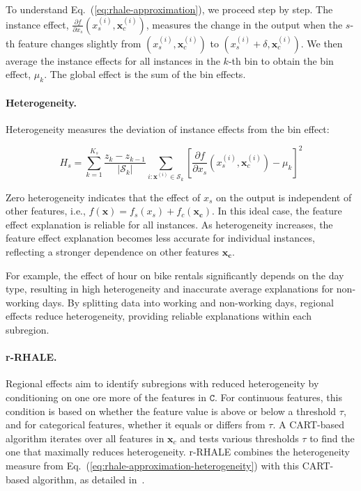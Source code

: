\documentclass[sigconf, nonacm]{acmart}
\newcommand{\xb}{\mathbf{x}}
\newcommand{\xc}{\mathbf{x_c}}
\newcommand{\xci}{\mathbf{x}^{(i)}_c}
\begin{document}
To understand Eq.~(\ref{eq:rhale-approximation}), we proceed step by step. The instance effect, $\frac{\partial f}{\partial x_s} (x_s^{(i)}, \xci)$, measures the change in the output when the $s$-th feature changes slightly from $(x_s^{(i)}, \xci)$ to $(x_s^{(i)} + \delta, \xci)$. We then average the instance effects for all instances in the $k$-th bin to obtain the bin effect, $\mu_k$. The global effect is the sum of the bin effects.

\paragraph{Heterogeneity.}

Heterogeneity measures the deviation of instance effects from the bin effect:

\begin{equation}
  \label{eq:rhale-approximation-heterogeneity}
  H_s = \sum_{k=1}^{K_s} \frac{z_k - z_{k-1}}{|\mathcal{S}_k|}\sum_{i: \xb^{(i)} \in \mathcal{S}_k} \left [ \frac{\partial f}{\partial x_s} (x_s^{(i)}, \xci) - \mu_k \right ]^2
\end{equation}

\noindent
Zero heterogeneity indicates that the effect of $x_s$ on the output is independent of other features, i.e., \( f(\xb) = f_s(x_s) + f_c(\xc) \). In this ideal case, the feature effect explanation is reliable for all instances. As heterogeneity increases, the feature effect explanation becomes less accurate for individual instances, reflecting a stronger dependence on other features $\xc$. 

For example, the effect of hour on bike rentals significantly depends on the day type, resulting in high heterogeneity and inaccurate average explanations for non-working days. By splitting data into working and non-working days, regional effects reduce heterogeneity, providing reliable explanations within each subregion.

\paragraph{r-RHALE.}

Regional effects aim to identify subregions with reduced heterogeneity by conditioning on one ore more of the features in \( \mathtt{C} \). For continuous features, this condition is based on whether the feature value is above or below a threshold \( \tau \), and for categorical features, whether it equals or differs from \( \tau \). A CART-based algorithm iterates over all features in \( \xb_c \) and tests various thresholds \( \tau \) to find the one that maximally reduces heterogeneity.
r-RHALE combines the heterogeneity measure from Eq.~(\ref{eq:rhale-approximation-heterogeneity}) with this CART-based algorithm, as detailed in~\cite{herbinger2023decomposing, gkolemis2024effector}.
\end{document}
